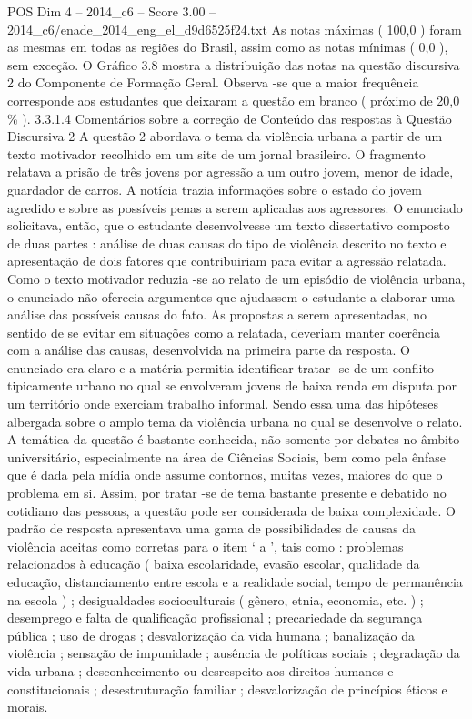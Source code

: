 \begin{textsample}{POS Dim 4 – 2014\_c6 – Score 3.00 – 2014\_c6/enade\_2014\_eng\_el\_d9d6525f24.txt}
As notas máximas ( 100,0 ) foram as mesmas em todas as regiões do Brasil, assim como as notas mínimas ( 0,0 ), sem exceção.
O Gráfico 3.8 mostra a distribuição das notas na questão discursiva 2 do Componente de Formação Geral.
Observa -se que a maior frequência corresponde aos estudantes que deixaram a questão em branco ( próximo de 20,0 \% ). 3.3.1.4 Comentários sobre a correção de Conteúdo das respostas à Questão Discursiva 2 A questão 2 abordava o tema da violência urbana a partir de um texto motivador recolhido em um site de um jornal brasileiro.
O fragmento relatava a prisão de três jovens por agressão a um outro jovem, menor de idade, guardador de carros.
A notícia trazia informações sobre o estado do jovem agredido e sobre as possíveis penas a serem aplicadas aos agressores.
O enunciado solicitava, então, que o estudante desenvolvesse um texto dissertativo composto de duas partes : análise de duas causas do tipo de violência descrito no texto e apresentação de dois fatores que contribuiriam para evitar a agressão relatada.
Como o texto motivador reduzia -se ao relato de um episódio de violência urbana, o enunciado não oferecia argumentos que ajudassem o estudante a elaborar uma análise das possíveis causas do fato.
As propostas a serem apresentadas, no sentido de se evitar em situações como a relatada, deveriam manter coerência com a análise das causas, desenvolvida na primeira parte da resposta.
O enunciado era claro e a matéria permitia identificar tratar -se de um conflito tipicamente urbano no qual se envolveram jovens de baixa renda em disputa por um território onde exerciam trabalho informal.
Sendo essa uma das hipóteses albergada sobre o amplo tema da violência urbana no qual se desenvolve o relato.
A temática da questão é bastante conhecida, não somente por debates no âmbito universitário, especialmente na área de Ciências Sociais, bem como pela ênfase que é dada pela mídia onde assume contornos, muitas vezes, maiores do que o problema em si.
Assim, por tratar -se de tema bastante presente e debatido no cotidiano das pessoas, a questão pode ser considerada de baixa complexidade.
O padrão de resposta apresentava uma gama de possibilidades de causas da violência aceitas como corretas para o item ‘ a ’, tais como : problemas relacionados à educação ( baixa escolaridade, evasão escolar, qualidade da educação, distanciamento entre escola e a realidade social, tempo de permanência na escola ) ; desigualdades socioculturais ( gênero, etnia, economia, etc. ) ; desemprego e falta de qualificação profissional ; precariedade da segurança pública ; uso de drogas ; desvalorização da vida humana ; banalização da violência ; sensação de impunidade ; ausência de políticas sociais ; degradação da vida urbana ; desconhecimento ou desrespeito aos direitos humanos e constitucionais ; desestruturação familiar ; desvalorização de princípios éticos e morais.

\end{textsample}
